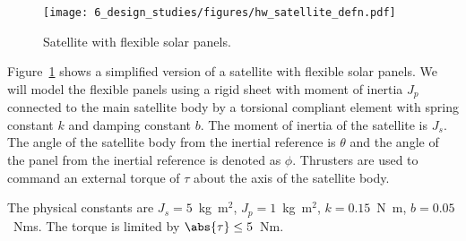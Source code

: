 
\begin{figure}[htb]
  \centering
  \texttt{[image: 6\_design\_studies/figures/hw\_satellite\_defn.pdf]}
  \caption{Satellite with flexible solar panels.}
  \label{fig:int_satellite_defn}
\end{figure}


Figure~\ref{fig:int_satellite_defn} shows a simplified version of a satellite with flexible solar panels.  We will model the flexible panels using a rigid sheet with moment of inertia $J_p$ connected to the main satellite body by a torsional compliant element with spring constant $k$ and damping constant $b$.  The moment of inertia of the satellite is $J_s$.  The angle of the satellite body from the inertial reference is $\theta$ and the angle of the panel from the inertial reference is denoted as $\phi$.  Thrusters are used to command an external torque of $\tau$ about the axis of the satellite body.

The physical constants are $J_s=5$~kg~m$^2$, $J_p=1$~kg~m$^2$, $k=0.15$~N~m, $b=0.05$~Nms.  The torque is limited by $\abs{\tau}\leq 5$~Nm.